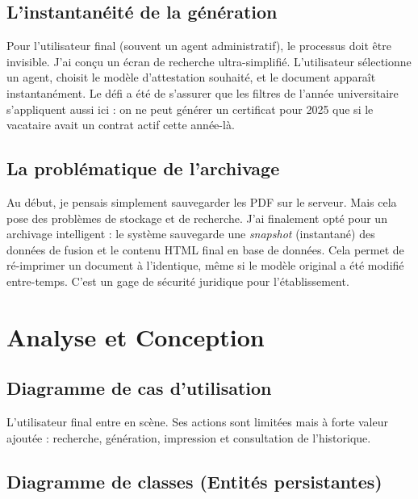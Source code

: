 \subsection{L'instantanéité de la génération}

Pour l'utilisateur final (souvent un agent administratif), le processus doit être invisible. J'ai conçu un écran de recherche ultra-simplifié. L'utilisateur sélectionne un agent, choisit le modèle d'attestation souhaité, et le document apparaît instantanément. Le défi a été de s'assurer que les filtres de l'année universitaire s'appliquent aussi ici : on ne peut générer un certificat pour 2025 que si le vacataire avait un contrat actif cette année-là.

\subsection{La problématique de l'archivage}

Au début, je pensais simplement sauvegarder les PDF sur le serveur. Mais cela pose des problèmes de stockage et de recherche. J'ai finalement opté pour un \og archivage intelligent \fg{} : le système sauvegarde une \textit{snapshot} (instantané) des données de fusion et le contenu HTML final en base de données. Cela permet de ré-imprimer un document à l'identique, même si le modèle original a été modifié entre-temps. C'est un gage de sécurité juridique pour l'établissement.

\section{Analyse et Conception}

\subsection{Diagramme de cas d'utilisation}

L'utilisateur final entre en scène. Ses actions sont limitées mais à forte valeur ajoutée : recherche, génération, impression et consultation de l'historique.


\subsection{Diagramme de classes (Entités persistantes)}

